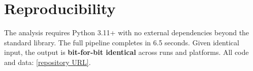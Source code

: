 \documentclass[11pt,a4paper]{article}
\begin{document}
\section{Reproducibility}
\label{app:reproducibility}

The analysis requires Python 3.11+ with no external dependencies beyond the standard library.
The full pipeline completes in 6.5 seconds.
Given identical input, the output is \textbf{bit-for-bit identical} across runs and platforms.
All code and data: \url{[repository URL]}.
\end{document}
